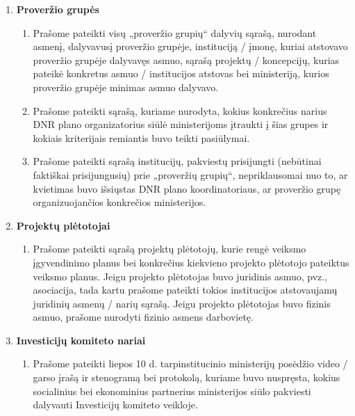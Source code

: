 \documentclass[12pt]{letter}
\begin{document}
\renewcommand{\labelenumi}{\Roman{enumi}}
\renewcommand{\labelenumii}{\arabic{enumii}}
\renewcommand{\labelenumiii}{\alph{enumiii}}


\begin{enumerate}
\item \textbf{Proveržio grupės}

\begin{enumerate}
\item Prašome pateikti visų „proveržio grupių“ dalyvių sąrašą, nurodant asmenį, dalyvavusį proveržio grupėje, instituciją / įmonę, kuriai atstovavo proveržio grupėje dalyvavęs asmuo, sąrašą projektų / koncepcijų, kurias pateikė konkretus asmuo / institucijos atstovas bei ministeriją, kurios proveržio grupėje minimas asmuo dalyvavo.

\item Prašome  pateikti sąrašą, kuriame nurodyta, kokius konkrečius narius DNR plano organizatorius siūlė ministerijoms įtraukti į šias grupes ir kokiais kriterijais remiantis buvo teikti pasiūlymai.

\item Prašome  pateikti sąrašą institucijų, pakviestų prisijungti (nebūtinai faktiškai prisijungusių) prie „proveržių grupių“, nepriklausomai nuo to, ar kvietimas buvo išsiųstas DNR plano koordinatoriaus, ar proveržio grupę organizuojančios konkrečios ministerijos.
\end{enumerate}


\newpage
\item \textbf{Projektų plėtotojai}
\begin{enumerate}[resume]
\item Prašome  pateikti  sąrašą projektų plėtotojų, kurie rengė veiksmo įgyvendinimo planus bei konkrečius kiekvieno projekto plėtotojo pateiktus veiksmo planus. Jeigu projekto plėtotojas buvo juridinis asmuo, pvz., asociacija, tada kartu prašome pateikti tokios institucijos atstovaujamų juridinių asmenų / narių sąrašą. Jeigu projekto plėtotojas buvo fizinis asmuo, prašome nurodyti fizinio asmens darbovietę.
\end{enumerate}

\item \textbf{Investicijų komiteto nariai}
\begin{enumerate}[resume]

\item Prašome  pateikti liepos 10 d. tarpinstitucinio ministerijų posėdžio video / garso įrašą ir stenogramą bei protokolą, kuriame buvo nuspręsta, kokius socialinius bei ekonominius partnerius ministerijos siūlo pakviesti dalyvauti Investicijų komiteto veikloje.


\end{enumerate}
\end{enumerate}
\end{document}
